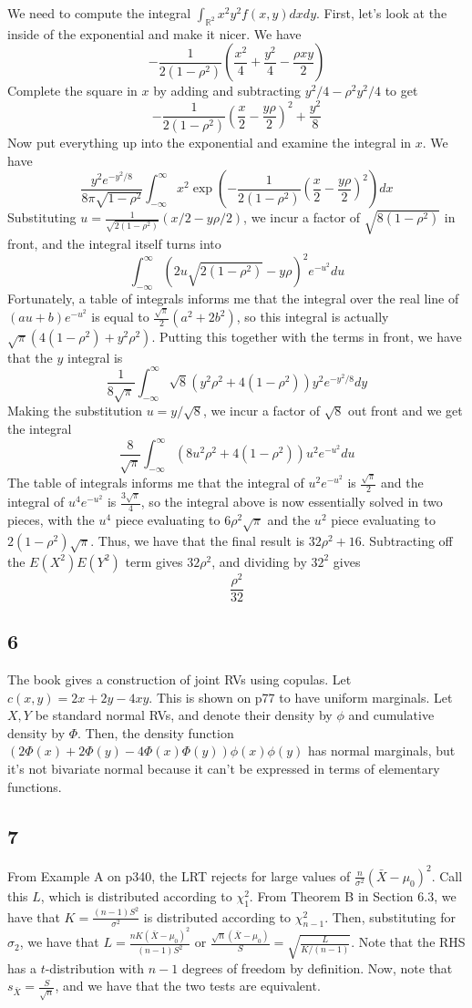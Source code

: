 \documentclass{article}
\newcommand{\rn}{\mathbb{R}}
\begin{document}
We need to compute the integral $\int_{\rn^2}x^2y^2f(x,y) dx dy$. First, let's look at the inside of the exponential and make it nicer. We have 
$$-\frac{1}{2(1-\rho^2)}\left(\frac{x^2}{4}+\frac{y^2}{4}-\frac{\rho xy}{2}\right)$$
Complete the square in $x$ by adding and subtracting $y^2/4-\rho^2y^2/4$ to get 
$$-\frac{1}{2(1-\rho^2)}\left(\frac{x}{2}-\frac{y\rho}{2}\right)^2+\frac{y^2}{8}$$
Now put everything up into the exponential and examine the integral in $x$. We have
$$\frac{y^2e^{-y^2/8}}{8\pi\sqrt{1-\rho^2}}\int_{-\infty}^{\infty}x^2\exp\left(-\frac{1}{2(1-\rho^2)}\left(\frac{x}{2}-\frac{y\rho}{2}\right)^2\right)dx$$
Substituting $u=\frac{1}{\sqrt{2(1-\rho^2)}}(x/2-y\rho/2)$, we incur a factor of $\sqrt{8(1-\rho^2)}$ in front, and the integral itself turns into 
$$\int_{-\infty}^{\infty}(2u\sqrt{2(1-\rho^2)}-y\rho)^2e^{-u^2}du$$
Fortunately, a table of integrals informs me that the integral over the real line of $(au+b)e^{-u^2}$ is equal to $\frac{\sqrt{\pi}}{2}(a^2+2b^2)$, so this integral is actually $\sqrt{\pi}(4(1-\rho^2)+y^2\rho^2)$. Putting this together with the terms in front, we have that the $y$ integral is 
$$\frac{1}{8\sqrt{\pi}}\int_{-\infty}^\infty\sqrt{8}(y^2\rho^2+4(1-\rho^2))y^2e^{-y^2/8} dy$$
Making the substitution $u=y/\sqrt{8}$, we incur a factor of $\sqrt{8}$ out front and we get the integral 
$$\frac{8}{\sqrt{\pi}}\int_{-\infty}^\infty(8u^2\rho^2+4(1-\rho^2))u^2e^{-u^2}du$$
The table of integrals informs me that the integral of $u^2e^{-u^2}$ is $\frac{\sqrt{\pi}}{2}$ and the integral of $u^4e^{-u^2}$ is $\frac{3\sqrt{\pi}}{4}$, so the integral above is now essentially solved in two pieces, with the $u^4$ piece evaluating to $6\rho^2\sqrt{\pi}$ and the $u^2$ piece evaluating to $2(1-\rho^2)\sqrt{\pi}$. Thus, we have that the final result is $32\rho^2+16$. Subtracting off the $E(X^2)E(Y^2)$ term gives $32\rho^2$, and dividing by $32^2$ gives 
$$\frac{\rho^2}{32}$$
\subsection*{6}
The book gives a construction of joint RVs using copulas. Let $c(x,y)=2x+2y-4xy$. This is shown on p77 to have uniform marginals. Let $X,Y$ be standard normal RVs, and denote their density by $\phi$ and cumulative density by $\Phi$. Then, the density function $(2\Phi(x)+2\Phi(y)-4\Phi(x)\Phi(y))\phi(x)\phi(y)$ has normal marginals, but it's not bivariate normal because it can't be expressed in terms of elementary functions.
\subsection*{7}
From Example A on p340, the LRT rejects for large values of $\frac{n}{\sigma^2}(\bar{X}-\mu_0)^2$. Call this $L$, which is distributed according to $\chi^2_1$. From Theorem B in Section 6.3, we have that $K=\frac{(n-1)S^2}{\sigma^2}$ is distributed according to $\chi^2_{n-1}$. Then, substituting for $\sigma_2$, we have that $L=\frac{nK(\bar{X}-\mu_0)^2}{(n-1)S^2}$ or $\frac{\sqrt{n}(\bar{X}-\mu_0)}{S}=\sqrt{\frac{L}{K/(n-1)}}$. Note that the RHS has a $t$-distribution with $n-1$ degrees of freedom by definition. Now, note that $s_{\bar{X}}=\frac{S}{\sqrt{n}}$, and we have that the two tests are equivalent.
\end{document}

